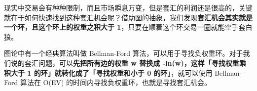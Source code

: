 \documentclass[12pt]{article}
\begin{document}
现实中交易会有种种限制，而且市场瞬息万变，但是套汇的利润还是很高的，关键就在于如何快速找到这种套汇机会呢？借助图的抽象，我们发现\textbf{套汇机会其实就是一个环，且这个环上的权重之积大于 1}，只要在顺着这个环交易一圈就能空手套白狼。

图论中有一个经典算法叫做 Bellman-Ford 算法，可以用于寻找负权重环。对于我们说的套汇问题，可以\textbf{先把所有边的权重 w 替换成 -ln(w)，这样「寻找权重乘积大于 1 的环」就转化成了「寻找权重和小于 0 的环」}，就可以使用 Bellman-Ford 算法在 O(EV) 的时间内寻找负权重环，也就是寻找套汇机会。





\end{document}
